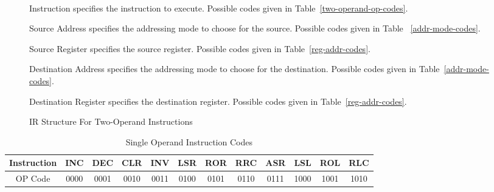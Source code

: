 \documentclass[12pt]{article}
\theoremstyle{plain}
\theoremstyle{definition}
\begin{document}
    \begin{figure}[H]
        \centering
        \caption{IR Structure For Two-Operand Instructions}
        \label{IR-TwoOp}
        \vspace{0.5 cm}
         \\
        \vspace{0.5 cm}
        \begin{regdesc}\begin{reglist}
            \item [Instruction] specifies the instruction to execute. Possible codes given in Table~\ref{two-operand-op-codes}.
            \item [Source Address] specifies the addressing mode to choose for the source. Possible codes given in Table ~\ref{addr-mode-codes}.
            \item [Source Register] specifies the source register. Possible codes given in Table~\ref{reg-addr-codes}.
            \item [Destination Address] specifies the addressing mode to choose for the destination. Possible codes given in Table~\ref{addr-mode-codes}.
            \item [Destination Register] specifies the destination register. Possible codes given in Table~\ref{reg-addr-codes}.
        \end{reglist}\end{regdesc}
    \end{figure}
    \begin{table}[H]
        \centering
        \begin{tabular}{|c|c|c|c|c|c|c|c|c|c|c|c|}
            \hline
            Instruction & INC  & DEC  & CLR  & INV  & LSR  & ROR  & RRC  & ASR & LSL & ROL & RLC  \\ \hline
            OP Code     & 0000 & 0001 & 0010 & 0011 & 0100 & 0101 & 0110 & 0111 & 1000 & 1001 & 1010 \\ \hline
        \end{tabular}
        \caption{Single Operand Instruction Codes}
        \label{single-operand-op-codes}
    \end{table}
\end{document}
